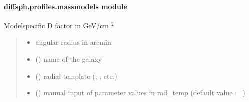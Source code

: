 \documentclass[letterpaper,10pt,english]{sphinxmanual}
\begin{document}
\paragraph{diffsph.profiles.massmodels module}
\label{\detokenize{diffsph.profiles:module-diffsph.profiles.massmodels}}\label{\detokenize{diffsph.profiles:diffsph-profiles-massmodels-module}}

\begin{fulllineitems}
\label{\detokenize{diffsph.profiles:diffsph.profiles.massmodels.D}}
\pysigstartsignatures
{}
\pysigstopsignatures
\sphinxAtStartPar
Model\sphinxhyphen{}specific D factor in GeV/cm \({}^2\)
\begin{quote}\begin{description}
\begin{itemize}
\item {} 
\sphinxAtStartPar
{} \textendash{} angular radius in arcmin

\item {} 
\sphinxAtStartPar
{} () \textendash{} name of the galaxy

\item {} 
\sphinxAtStartPar
{} () \textendash{} radial template (, , etc.)

\item {} 
\sphinxAtStartPar
{} () \textendash{} manual input of parameter values in rad\_temp (default value = )


\end{itemize}
\end{description}
\end{quote}
\end{fulllineitems}
\end{document}
